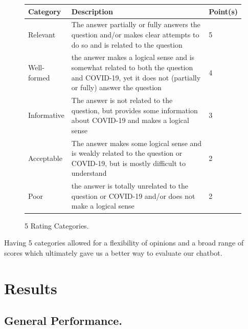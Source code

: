 \documentclass[sigconf,natbib=false]{acmart}
\begin{document}
\begin{figure}[H]
  \small
  \begin{tabular}{p{0.2\linewidth}p{0.7\linewidth}p{0.1\linewidth}}
    \toprule
    Category & Description & Point(s)\\
    \midrule
    Relevant & The answer partially or fully answers the question and/or
      makes clear attempts to do so and is related to the question & 5\\
    \midrule
    Well-formed & the answer makes a logical sense and is somewhat related
      to both the question and COVID-19, yet it does not (partially or
      fully) answer the question & 4\\
    \midrule
    Informative & The answer is not related to the question, but provides
        some information about COVID-19 and makes a logical sense & 3\\
    \midrule
    Acceptable & The answer makes some logical sense and is weakly related   to the question or COVID-19, but is mostly difficult to understand &
      2\\
    \midrule
    Poor & the answer is totally unrelated to the question or COVID-19
      and/or does not make a logical sense & 2\\
    \bottomrule
  \end{tabular}
  \caption{5 Rating Categories.}
\end{figure}

\noindent Having 5 categories allowed for a flexibility of opinions and a broad range of scores which ultimately gave us a better way to evaluate
our chatbot.


\section{Results}

\subsection{General Performance.}
\end{document}
